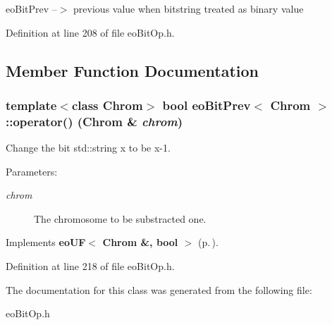 eo\-Bit\-Prev --$>$ previous value when bitstring treated as binary value 



Definition at line 208 of file eo\-Bit\-Op.h.

\subsection{Member Function Documentation}
\subsubsection{\setlength{\rightskip}{0pt plus 5cm}template$<$class Chrom$>$ bool {\bf eo\-Bit\-Prev}$<$ Chrom $>$::operator() (Chrom \& {\em chrom})\hspace{0.3cm}{\tt  [inline, virtual]}}\label{classeo_bit_prev_a1}


Change the bit std::string x to be x-1. 

\begin{Desc}
\item[Parameters:]
\begin{description}
\item[{\em chrom}]The chromosome to be substracted one. \end{description}
\end{Desc}


Implements {\bf eo\-UF$<$ Chrom \&, bool $>$} {\rm (p.\,\pageref{classeo_u_f_a1})}.

Definition at line 218 of file eo\-Bit\-Op.h.

The documentation for this class was generated from the following file:\begin{CompactItemize}
\item 
eo\-Bit\-Op.h\end{CompactItemize}

